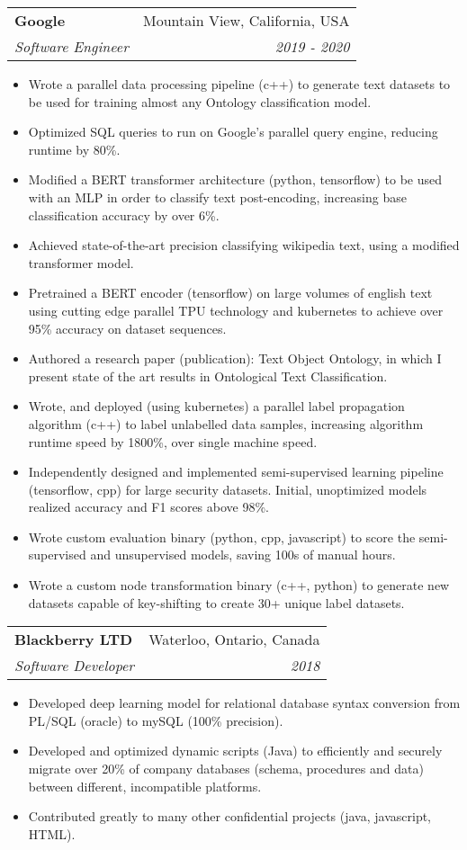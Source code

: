 \documentclass[letterpaper,12pt]{article}
\makeatletter
\newcommand{\resumeSubheading}[4]{
  \vspace{-1pt}\item
    \begin{tabular*}{0.97\textwidth}{l@{\extracolsep{\fill}}r}
      \textbf{#1} & #2 \\
      \textit{\small#3} & \textit{\small #4} \\
    \end{tabular*}\vspace{-5pt}
}
\newcommand{\resumeItemListStart}{\begin{itemize}}
\newcommand{\resumeItemListEnd}{\end{itemize}\vspace{-5pt}}
\makeatother
\begin{document}
\resumeSubheading
{Google}{Mountain View, California, USA}{Software Engineer}{2019 - 2020}
\resumeItemListStart
\item {Wrote a parallel data processing pipeline (c++) to generate text datasets to be used for training almost any Ontology classification model.}
\item {Optimized SQL queries to run on Google's parallel query engine, reducing runtime by 80\%.}
\item {Modified a BERT transformer architecture (python, tensorflow) to be used with an MLP in order to classify text post-encoding, increasing base classification accuracy by over 6\%.}
\item {Achieved state-of-the-art precision classifying wikipedia text, using a modified transformer model.}
\item {Pretrained a BERT encoder (tensorflow) on large volumes of english text using cutting edge parallel TPU technology and kubernetes to achieve over 95\% accuracy on dataset sequences.}
\item {Authored a research paper (publication): Text Object Ontology, in which I present state of the art results in Ontological Text Classification.}
\item {Wrote, and deployed (using kubernetes) a parallel label propagation algorithm (c++) to label unlabelled data samples, increasing algorithm runtime speed by 1800\%, over single machine speed.}
\item {Independently designed and implemented semi-supervised learning pipeline (tensorflow, cpp) for large security datasets. Initial, unoptimized models realized accuracy and F1 scores above 98\%.}
\item {Wrote custom evaluation binary (python, cpp, javascript) to score the semi-supervised and unsupervised models, saving 100s of manual hours.}
\item {Wrote a custom node transformation binary (c++, python) to generate new datasets capable of key-shifting to create 30+ unique label datasets.}
\resumeItemListEnd

\resumeSubheading
{Blackberry LTD}{Waterloo, Ontario, Canada}{Software Developer}{2018}
\resumeItemListStart
\item {Developed deep learning model for relational database syntax conversion from PL/SQL (oracle) to mySQL (100\% precision).}
\item {Developed and optimized dynamic scripts (Java) to efficiently and securely migrate over 20\% of company databases (schema, procedures and data) between different, incompatible platforms.}
\item {Contributed greatly to many other confidential projects (java, javascript, HTML).}
\resumeItemListEnd
\end{document}
